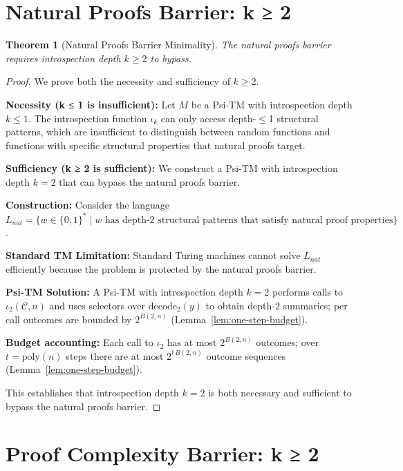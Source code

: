 \documentclass[11pt]{article}
\newtheorem{theorem}{Theorem}
\begin{document}
\section{Natural Proofs Barrier: k ≥ 2}

\begin{theorem}[Natural Proofs Barrier Minimality]
The natural proofs barrier requires introspection depth $k \geq 2$ to bypass.
\end{theorem}

\begin{proof}
We prove both the necessity and sufficiency of $k \geq 2$.

\textbf{Necessity (k ≤ 1 is insufficient):}
Let $M$ be a Psi-TM with introspection depth $k \leq 1$. The introspection function $\iota_k$ can only access depth-$\leq$1 structural patterns, which are insufficient to distinguish between random functions and functions with specific structural properties that natural proofs target.

\textbf{Sufficiency (k ≥ 2 is sufficient):}
We construct a Psi-TM with introspection depth $k = 2$ that can bypass the natural proofs barrier.

\textbf{Construction:}
Consider the language $L_{nat} = \{w \in \{0,1\}^* \mid w \text{ has depth-2 structural patterns that satisfy natural proof properties}\}$.

\textbf{Standard TM Limitation:}
Standard Turing machines cannot solve $L_{nat}$ efficiently because the problem is protected by the natural proofs barrier.

\textbf{Psi-TM Solution:}
A Psi-TM with introspection depth $k = 2$ performs calls to $\iota_2(\mathcal{C},n)$ and uses selectors over $\mathrm{decode}_2(y)$ to obtain depth-2 summaries; per call outcomes are bounded by $2^{B(2,n)}$ (Lemma~\ref{lem:one-step-budget}).

\textbf{Budget accounting:}
Each call to $\iota_2$ has at most $2^{B(2,n)}$ outcomes; over $t=\mathrm{poly}(n)$ steps there are at most $2^{t\,B(2,n)}$ outcome sequences (Lemma~\ref{lem:one-step-budget}).

This establishes that introspection depth $k = 2$ is both necessary and sufficient to bypass the natural proofs barrier.
\end{proof}

\section{Proof Complexity Barrier: k ≥ 2}
\end{document}
